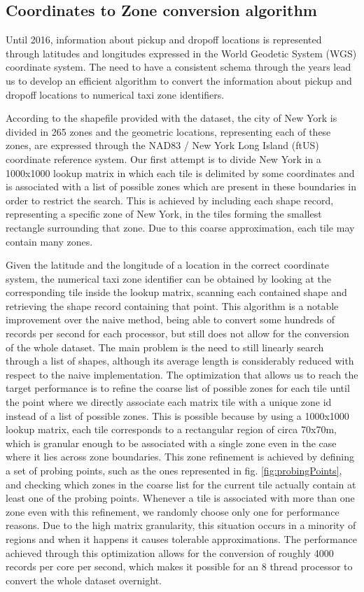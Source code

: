 \documentclass{acm_proc_article-sp-sigmod09}
\begin{document}
\subsection{Coordinates to Zone conversion algorithm}

Until 2016, information about pickup and dropoff locations is represented through latitudes and longitudes expressed in the World Geodetic System (WGS) coordinate system. The need to have a consistent schema through the years lead us to develop an efficient algorithm to convert the information about pickup and dropoff locations to numerical taxi zone identifiers. 

According to the shapefile provided with the dataset, the city of New York is divided in 265 zones and the geometric locations, representing each of these zones, are expressed through the NAD83 / New York Long Island (ftUS) coordinate reference system. Our first attempt is to divide New York in a 1000x1000 lookup matrix in which each tile is delimited by some coordinates and is associated with a list of possible zones which are present in these boundaries in order to restrict the search. This is achieved by including each shape record, representing a specific zone of New York, in the tiles forming the smallest rectangle surrounding that zone. Due to this coarse approximation, each tile may contain many zones.

Given the latitude and the longitude of a location in the correct coordinate system, the numerical taxi zone identifier can be obtained by looking at the corresponding tile inside the lookup matrix, scanning each contained shape and retrieving the shape record containing that point. This algorithm is a notable improvement over the naive method, being able to convert some hundreds of records per second for each processor, but still does not allow for the conversion of the whole dataset. The main problem is the need to still linearly search through a list of shapes, although its average length is considerably reduced with respect to the naive implementation. The optimization that allows us to reach the target performance is to refine the coarse list of possible zones for each tile until the point where we directly associate each matrix tile with a unique zone id instead of a list of possible zones. This is possible because by using a 1000x1000 lookup matrix, each tile corresponds to a rectangular region of circa 70x70m, which is granular enough to be associated with a single zone even in the case where it lies across zone boundaries. This zone refinement is achieved by defining a set of probing points, such as the ones represented in fig. \ref{fig:probingPoints}, and checking which zones in the coarse list for the current tile actually contain at least one of the probing points. Whenever a tile is associated with more than one zone even with this refinement, we randomly choose only one for performance reasons. Due to the high matrix granularity, this situation occurs in a minority of regions and when it happens it causes tolerable approximations. The performance achieved through this optimization allows for the conversion of roughly 4000 records per core per second, which makes it possible for an 8 thread processor to convert the whole dataset overnight.
\end{document}
